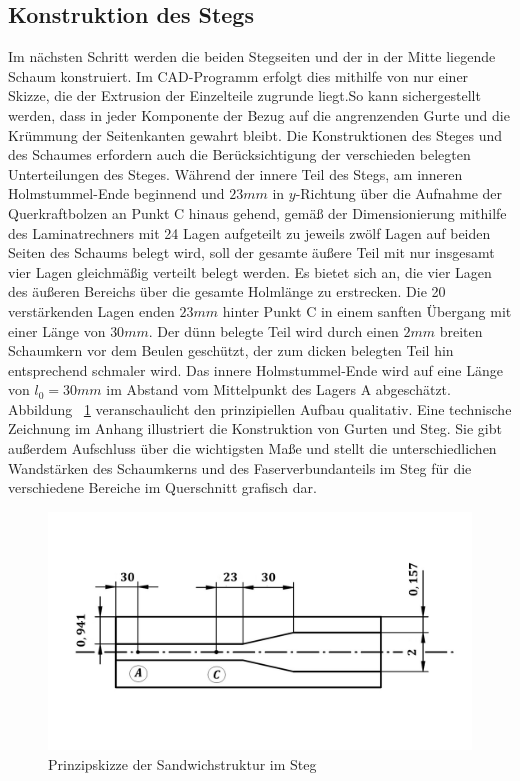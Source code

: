 \subsection{Konstruktion des Stegs}
\noindent Im nächsten Schritt werden die beiden Stegseiten und der in der Mitte liegende Schaum konstruiert. Im CAD-Programm erfolgt dies mithilfe von nur einer Skizze, die der Extrusion der Einzelteile zugrunde liegt.So kann sichergestellt werden, dass in jeder Komponente der Bezug auf die angrenzenden Gurte und die Krümmung der Seitenkanten gewahrt bleibt. Die Konstruktionen des Steges und des Schaumes erfordern auch die Berücksichtigung der verschieden belegten Unterteilungen des Steges. Während der innere Teil des Stegs, am inneren Holmstummel-Ende beginnend und $ 23mm $ in $y$-Richtung über die Aufnahme der Querkraftbolzen an Punkt C hinaus gehend, gemäß der Dimensionierung mithilfe des Laminatrechners mit 24 Lagen aufgeteilt zu jeweils zwölf Lagen auf beiden Seiten des Schaums belegt wird, soll der gesamte äußere Teil mit nur insgesamt vier Lagen gleichmäßig verteilt belegt werden. Es bietet sich an, die vier Lagen des äußeren Bereichs über die gesamte Holmlänge zu erstrecken. Die 20 verstärkenden Lagen enden $ 23mm $ hinter Punkt C in einem sanften Übergang mit einer Länge von $ 30mm $. Der dünn belegte Teil wird durch einen $ 2mm $ breiten Schaumkern vor dem Beulen geschützt, der zum dicken belegten Teil hin entsprechend schmaler wird. Das innere Holmstummel-Ende wird auf eine Länge von $ l_{0}=30mm $ im Abstand vom Mittelpunkt des Lagers A abgeschätzt. Abbildung ~\ref{fig: Steg} veranschaulicht den prinzipiellen Aufbau qualitativ. Eine technische Zeichnung im Anhang illustriert die Konstruktion von Gurten und Steg. Sie gibt außerdem Aufschluss über die wichtigsten Maße und stellt die unterschiedlichen Wandstärken des Schaumkerns und des Faserverbundanteils im Steg für die verschiedene Bereiche im Querschnitt grafisch dar.

\begin{figure}[h]
	\includegraphics[width=1.0\textwidth]{Bilder/StegPrinzip.jpg}
	\caption{Prinzipskizze der Sandwichstruktur im Steg}
	\label{fig: Steg}
\end{figure}


